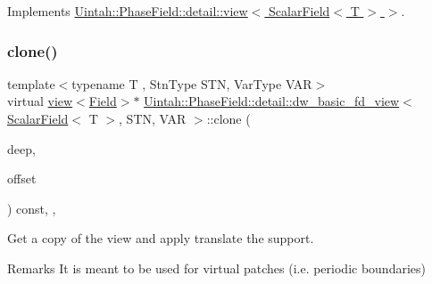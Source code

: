 Implements \hyperlink{classUintah_1_1PhaseField_1_1detail_1_1view_3_01ScalarField_3_01T_01_4_01_4_a6e11243c9d776a7b703e524ea4151a16}{Uintah\+::\+Phase\+Field\+::detail\+::view$<$ Scalar\+Field$<$ T $>$ $>$}.

\mbox{\label{classUintah_1_1PhaseField_1_1detail_1_1dw__basic__fd__view_3_01ScalarField_3_01T_01_4_00_01STN_00_01VAR_01_4_aea06a1fde74c23fae95356021548da34}} 
\subsubsection{\texorpdfstring{clone()}{clone()}\hspace{0.1cm}{\footnotesize\ttfamily [2/2]}}
{\footnotesize\ttfamily template$<$typename T , Stn\+Type S\+TN, Var\+Type V\+AR$>$ \\
virtual \hyperlink{classUintah_1_1PhaseField_1_1detail_1_1view}{view}$<$\hyperlink{structUintah_1_1PhaseField_1_1ScalarField}{Field}$>$$\ast$ \hyperlink{classUintah_1_1PhaseField_1_1detail_1_1dw__basic__fd__view}{Uintah\+::\+Phase\+Field\+::detail\+::dw\+\_\+basic\+\_\+fd\+\_\+view}$<$ \hyperlink{structUintah_1_1PhaseField_1_1ScalarField}{Scalar\+Field}$<$ T $>$, S\+TN, V\+AR $>$\+::clone (\begin{DoxyParamCaption}\item[{bool}]{deep,  }\item[{const Int\+Vector \&}]{offset }\end{DoxyParamCaption}) const\hspace{0.3cm}{\ttfamily [inline]}, {\ttfamily [override]}, {\ttfamily [virtual]}}



Get a copy of the view and apply translate the support. 

\begin{DoxyRemark}{Remarks}
It is meant to be used for virtual patches (i.\+e. periodic boundaries)
\end{DoxyRemark}

